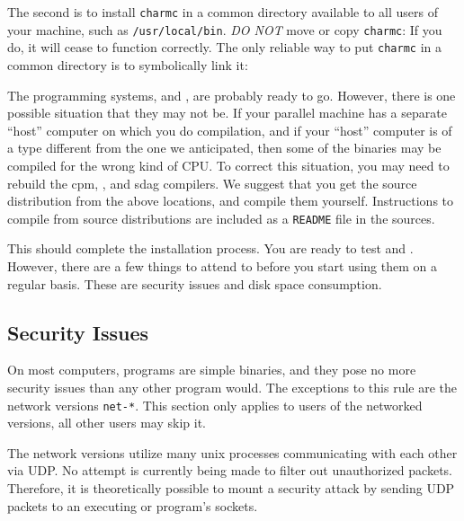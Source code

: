 \begin{alltt}
    % setenv PATH /usr/local/charm/bin:$PATH
\end{alltt}

The second is to install {\tt charmc} in a common directory available
to all users of your machine, such as {\tt /usr/local/bin}.  {\em DO
NOT} move or copy {\tt charmc}: If you do, it will cease to function correctly.
The only reliable way to
put {\tt charmc} in a common directory is to symbolically link it:

\begin{alltt}
    % ln -s /usr/local/charm/bin/charmc /usr/local/bin/charmc
\end{alltt}

The programming systems, \converse{} and \charmpp{}, are
probably ready to go.  However, there is one possible situation that
they may not be.  If your parallel machine has a separate ``host''
computer on which you do compilation, and if your ``host'' computer is
of a type different from the one we anticipated, then some of the
binaries may be compiled for the wrong kind of CPU.  To correct this
situation, you may need to rebuild the cpm, \charmpp{}, and sdag compilers.
We suggest that you get the source distribution from the above locations,
and compile them yourself. Instructions to compile from source
distributions are included as a {\tt README} file in the sources.

This should complete the installation process.  You are ready to test
\converse{} and \charmpp{}.  However, there are a few things to
attend to before you start using them on a regular basis.  These are
security issues and disk space consumption.

\subsection{Security Issues}

On most computers, \charmpp{} programs are simple binaries, and they pose
no more security issues than any other program would.  The exceptions
to this rule are the network versions {\tt net-*}.  
This section only applies to users
of the networked versions, all other users may skip it.

The network versions utilize many unix processes communicating with
each other via UDP.  No attempt is currently being made to filter out
unauthorized packets.  Therefore, it is theoretically possible to
mount a security attack by sending UDP packets to an executing
\converse{} or \charmpp{} program's sockets.

